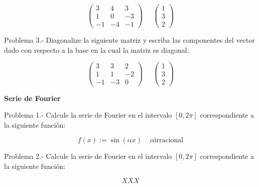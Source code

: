 \documentclass{article}
\begin{document}
\begin{equation}
  \left( 
    \begin{array}{ccc}
         3 & 4 &  3 \\
         1 & 0 & -3 \\
         -1 & -4 &  -1
    \end{array}
    \right)
    \;\;\;\;\;
    \left( 
    \begin{array}{c}
          1  \\
          3  \\
          2  
    \end{array}
    \right)
\end{equation}


Problema 3.- Diagonalize la siguiente matriz y escriba las componentes
del vector dado con respecto a la base en la cual la matriz es diagonal.

\begin{equation}
  \left( 
    \begin{array}{ccc}
          3 & 3 & 2 \\
          1 & 1 & -2 \\
          -1 & -3 & 0  
    \end{array}
    \right)
    \;\;\;\;\;
    \left( 
    \begin{array}{c}
          1  \\
          3  \\
          2  
    \end{array}
    \right)
\end{equation}
\vspace{1cm}


\begin{center}
  \textbf{Serie de Fourier}
\end{center}
\vspace{1cm}

Problema 1.- Calcule la serie de Fourier en el intervalo $[0,2\pi]$ 
correspondiente a la siguiente funci\'on:

\begin{equation}
  f(x) := \sin(\alpha x) \;\;\;\; \alpha \mbox{irracional}
\end{equation}


Problema 2.- Calcule la serie de Fourier en el intervalo $[0,2\pi]$ 
correspondiente a la siguiente funci\'on:

\begin{equation}
XXX 
\end{equation}
\end{document}
